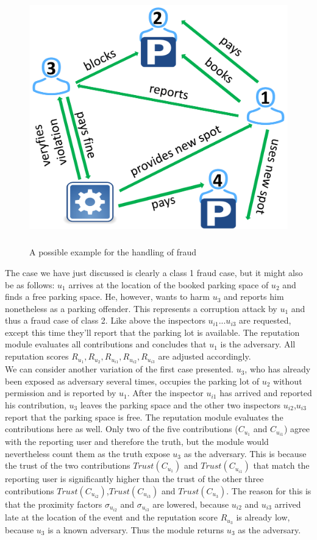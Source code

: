 \begin{figure}
	\centering
	\includegraphics[width=13cm,height=11cm]{logos/example-grafik.pdf}
	\caption{A possible example for the handling of fraud}
	\label{img:example-grafik}
\end{figure}
 
The case we have just discussed is clearly a class 1 fraud case, but it might also be as follows: $u_1$ arrives at the location of the booked parking space of $u_2$ and finds a free parking space. He, however, wants to harm $u_3$ and reports him nonetheless as a parking offender. This represents a corruption attack by $u_1$ and thus a fraud case of class 2. Like above the inspectors $u_{i1}$...$u_{i3}$ are requested, except this time they'll report that the parking lot is available. The reputation module evaluates all contributions and concludes that $u_1$ is the adversary. All reputation scores $R_{u_1}, R_{u_2}, R_{u_{i1}}, R_{u_{i2}}, R_{u_{i3}}$ are adjusted accordingly.\\

We can consider another variation of the first case presented. $u_3$, who has already been exposed as adversary several times, occupies the parking lot of $u_2$ without permission and is reported by $u_1$. After the inspector $u_{i1}$ has arrived and reported his contribution, $u_3$ leaves the parking space and the other two inspectors $u_{i2}$,$u_{i3}$ report that the parking space is free. The reputation module evaluates the contributions here as well. Only two of the five contributions ($C_{u_{1}}$ and $C_{u_{i1}}$) agree with the reporting user and therefore the truth, but the module would nevertheless count them as the truth expose $u_3$ as the adversary. This is because the trust of the two contributions $Trust(C_{u_{1}})$ and $Trust(C_{u_{i1}})$ that match the reporting user is significantly higher than the trust of the other three contributions $Trust(C_{u_{i2}})$,$Trust(C_{u_{i3}})$ and $Trust(C_{u_{3}})$. The reason for this is that the proximity factors $\sigma_{u_{i2}}$ and $\sigma_{u_{i3}}$ are lowered, because $u_{i2}$ and $u_{i3}$ arrived late at the location of the event and the reputation score $R_{u_3}$ is already low, because $u_3$ is a known adversary. Thus the module returns $u_3$ as the adversary.